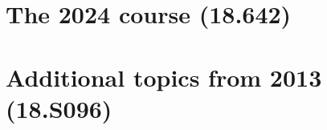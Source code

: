 \ifdefined\publicmode\documentclass[11pt,oneside,openany]{book}\else\documentclass[12pt,oneside,openany]{book}\fi
\begin{document}
\mainmatter
\part{The 2024 course (18.642)}\label{part:2024}



















\part{Additional topics from 2013 (18.S096)}\label{part:2013}








\appendix




\end{document}
